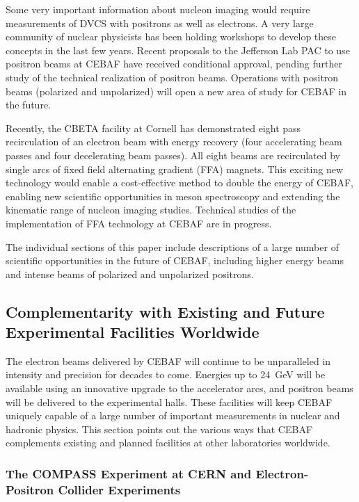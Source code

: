 Some very important information about nucleon imaging would require measurements of DVCS with positrons as well as electrons. A very large community of nuclear physicists has been holding workshops to develop these concepts in the last few years. Recent proposals to the Jefferson Lab PAC to use positron beams at CEBAF have received conditional approval, pending further study of the technical realization of positron beams. Operations with positron beams (polarized and unpolarized) will open a new area of study for CEBAF in the future.

Recently, the CBETA facility at Cornell has demonstrated eight pass recirculation of an electron beam with energy recovery (four accelerating beam passes and four decelerating beam passes). All eight beams are recirculated by single arcs of fixed field alternating gradient (FFA) magnets. This exciting new technology would enable a cost-effective method to double the energy of CEBAF, enabling new scientific opportunities in meson spectroscopy and extending the kinematic range of nucleon imaging studies. Technical studies of the implementation of FFA technology at CEBAF are in progress.

The individual sections of this paper include descriptions of a large number of scientific opportunities in the future of CEBAF, including higher energy beams and intense beams of polarized and unpolarized positrons.

\subsection{Complementarity with Existing and Future Experimental Facilities Worldwide}

The electron beams delivered by CEBAF will continue to be unparalleled in intensity and precision for decades to come. Energies up to 24~GeV will be available using an innovative upgrade to the accelerator arcs, and %
positron beams will be delivered to the experimental halls. These facilities will keep CEBAF uniquely capable of a large number of important measurements in nuclear and hadronic physics. This section points out the various ways that CEBAF complements existing and planned facilities at other laboratories worldwide.

\subsubsection{The COMPASS Experiment at CERN and Electron-Positron Collider Experiments}

